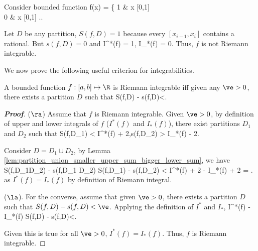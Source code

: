 
\begin{example}
Consider bounded function
\be
f(x) = \left\{
1 \quad \quad & x [0,1]\\
0 & x [0,1]
\ea\right..
\ee

Let $D$ be any partition, $S(f,D)=1$ because every $[x_{i-1},x_i]$ contains a rational. But $s(f,D)=0$ and
\be
I^*(f) = 1, \qquad I_*(f) = 0.
\ee
Thus, $f$ is not Riemann integrable.
\end{example}

We now prove the following useful criterion for integrabilities.

\begin{theorem}\label{thm:riemann_integrable_iff_upper_lower_sum_close_enough}%
A bounded function $f:[a,b]\mapsto \R$ is Riemann integrable iff given any $\ve>0$, there exists a partition $D$ such that
\be
S(f,D) - s(f,D)<\ve.
\ee
\end{theorem}

\begin{proof}[{\bf Proof}]
($\ra$) Assume that $f$ is Riemann integrable. Given $\ve>0$, by definition of upper and lower integrals of $f$ ($I^*(f)$ and $I_*(f)$), there exist partitions $D_1$ and $D_2$ such that
\be
S(f,D_1) < I^*(f) + \frac{\ve}2,\qquad s(f,D_2) > I_*(f) - \frac{\ve}2.
\ee

Consider $D=D_1\cup D_2$, by Lemma \ref{lem:partition_union_smaller_upper_sum_bigger_lower_sum}, we have
\be
S(f,D_1\cup D_2) - s(f,D_1 \cup D_2) \leq S(f,D_1) - s(f,D_2) < I^*(f) + \frac{\ve}2 - I_*(f) + \frac{\ve}2 = \ve.
\ee
as $I^*(f) = I_*(f)$ by definition of Riemann integral.

($\la$). For the converse, assume that given $\ve>0$, there exists a partition $D$ such that $S(f,D) - s(f,D)<\ve$. Applying the definition of $I^*$ and $I_*$,
\leq I^*(f) - I_*(f) \leq S(f,D) - s(f,D)<\ve.
\ee

Given this is true for all $\ve>0$, $I^*(f) = I_*(f)$. Thus, $f$ is Riemann integrable.
\end{proof}


